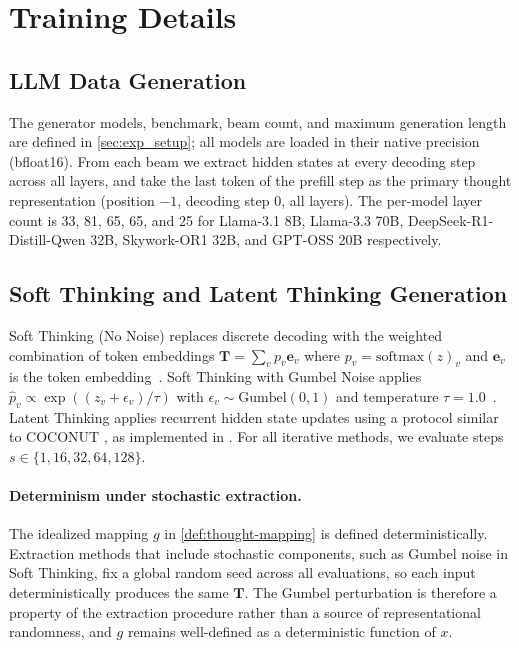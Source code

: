 \section{Training Details}
\label{appendix:sub:train_details}

\subsection{LLM Data Generation}
The generator models, benchmark, beam count, and maximum generation length
are defined in \cref{sec:exp_setup}; all models are loaded in their native precision (bfloat16). From each beam we extract hidden states at every decoding step
across all layers, and take the last token of the prefill step as the
primary thought representation (position $-1$, decoding step $0$, all
layers). The per-model layer count is 33, 81, 65, 65, and 25 for
Llama-3.1 8B, Llama-3.3 70B, DeepSeek-R1-Distill-Qwen 32B, Skywork-OR1 32B, and
GPT-OSS 20B respectively.

\subsection{Soft Thinking and Latent Thinking Generation}
\label{appendix:sub:soft_latent_formula}
Soft Thinking (No Noise) replaces discrete decoding with the
weighted combination of token embeddings $\mathbf{T} = \sum_v p_v \mathbf{e}_v$
where $p_v = \mathrm{softmax}(z)_v$ and $\mathbf{e}_v$ is the token
embedding~\citep{zhang2025softthinkingunlockingreasoning}.
Soft Thinking with Gumbel Noise applies $\hat{p}_v \propto \exp((z_v + \epsilon_v)/\tau)$
with $\epsilon_v \sim \mathrm{Gumbel}(0,1)$ and temperature
$\tau=1.0$~\citep{wu2026llms}.
Latent Thinking applies recurrent hidden state updates using
a protocol similar to COCONUT \citep{hao2024training}, as implemented in \citet{zou2025latentcollaborationmultiagentsystems}.
For all iterative methods, we evaluate steps
$s \in \{1, 16, 32, 64, 128\}$.

\paragraph{Determinism under stochastic extraction.}
The idealized mapping $g$ in \cref{def:thought-mapping} is defined deterministically. Extraction methods that include stochastic components, such as Gumbel noise in Soft Thinking, fix a global random seed across all evaluations, so each input deterministically produces the same $\mathbf{T}$. The Gumbel perturbation is therefore a property of the extraction procedure rather than a source of representational randomness, and $g$ remains well-defined as a deterministic function of $x$.

